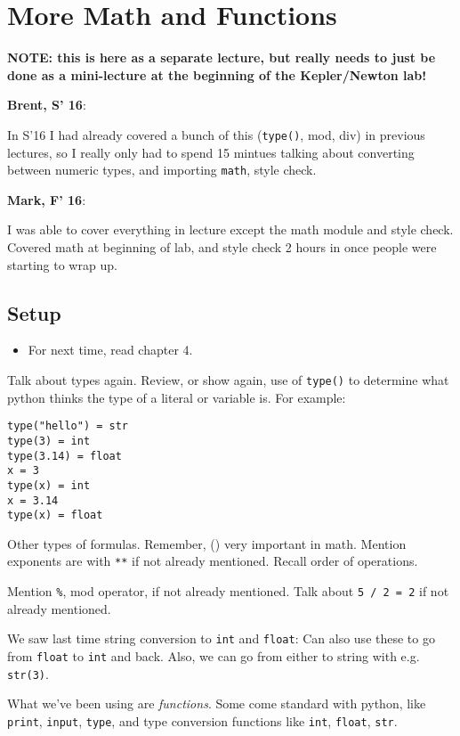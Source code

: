 \documentclass{article}
\newenvironment{reflect}[1]
{
  \noindent
  \begin{lrbox}{\reflectbox}
    \begin{minipage}[t]{\textwidth}
      \textbf{#1}:
}{
    \end{minipage}
  \end{lrbox}
  \fbox{\usebox{\reflectbox}}
}
\begin{document}
\newpage

\section{More Math and Functions}

\textbf{NOTE: this is here as a separate lecture, but really needs to
  just be done as a mini-lecture at the beginning of the Kepler/Newton
  lab!}

\begin{reflect}{Brent, S' 16}
  In S'16 I had already covered a bunch of this (\verb|type()|, mod,
  div) in previous lectures, so I really only had to spend 15 mintues
  talking about converting between numeric types, and importing
  \verb|math|, style check.
\end{reflect}
\begin{reflect}{Mark, F' 16}
  I was able to cover everything in lecture except the math module and
  style check. Covered math at beginning of lab, and style check 2 hours in
  once people were starting to wrap up.
\end{reflect}

\subsection*{Setup}
\begin{itemize}
\item For next time, read chapter 4.
\end{itemize}

Talk about types again.  Review, or show again, use of \verb|type()|
to determine what python thinks the type of a literal or variable is.
For example:
\begin{verbatim}
type("hello") = str
type(3) = int
type(3.14) = float
x = 3
type(x) = int
x = 3.14
type(x) = float
\end{verbatim}

Other types of formulas.  Remember, () very important in math.
Mention exponents are with \verb|**| if not already mentioned. Recall
order of operations.

Mention \verb|%|, mod operator, if not already mentioned.
Talk about \verb|5 / 2 = 2| if not already mentioned.

We saw last time string conversion to \verb|int| and \verb|float|: Can
also use these to go from \verb|float| to \verb|int| and back.  Also,
we can go from either to string with e.g. \verb|str(3)|.

What we've been using are \emph{functions}.  Some come standard with
python, like \verb|print|, \verb|input|, \verb|type|, and type
conversion functions like \verb|int|, \verb|float|, \verb|str|.
\end{document}
